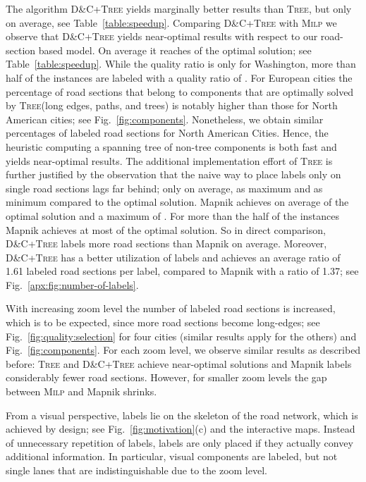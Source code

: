 \documentclass[a4paper,11pt]{article}
\newcommand{\TreeAlgo}{\textsc{Tree}\xspace}
\newcommand{\ILPAlgo}{\textsc{Milp}\xspace}
\newcommand{\Shredder}{\textsc{D\&C}}
\begin{document}
The algorithm \Shredder+\TreeAlgo yields marginally better results
than \TreeAlgo, but only  on average, see
Table~\ref{table:speedup}. Comparing \Shredder+\TreeAlgo with \ILPAlgo
we observe that \Shredder+\TreeAlgo yields near-optimal results with
respect to our road-section based model.  On average it reaches 
of the optimal solution; see Table~\ref{table:speedup}. While the
quality ratio is only  for Washington, more than half of the
instances are labeled with a quality ratio of .  For
European cities the percentage of road sections that belong to
components that are optimally solved by \TreeAlgo (long edges, paths,
and trees) is notably higher than those for North American cities; see
Fig.~\ref{fig:components}. Nonetheless, we obtain similar percentages
of labeled road sections for North American Cities. Hence, the
heuristic computing a spanning tree of non-tree components is both
fast and yields near-optimal results. The additional implementation
effort of \TreeAlgo is further justified by the observation that the
naive way to place labels only on single road sections lags far
behind; only  on average,  as maximum and  as
minimum compared to the optimal solution.  Mapnik achieves on average
 of the optimal solution and a maximum of . For more than
the half of the instances Mapnik achieves at most  of the
optimal solution. So in direct comparison, \Shredder+\TreeAlgo labels
 more road sections than Mapnik on average. 
Moreover, \Shredder+\TreeAlgo has a better utilization of labels and achieves an average ratio of 1.61 labeled road sections per label, compared to Mapnik with a ratio of 1.37; see Fig.~\ref{apx:fig:number-of-labels}.






With increasing zoom level the number of
labeled road sections is increased, which is to be expected, since
more road sections become long-edges; see
Fig.~\ref{fig:quality:selection} for four cities (similar results apply for the others) and
Fig.~\ref{fig:components}. For each zoom level, we observe
similar results as described before: \TreeAlgo and \Shredder+\TreeAlgo
achieve near-optimal solutions and
Mapnik labels considerably fewer road sections. However, for smaller zoom
levels the gap between \ILPAlgo and Mapnik shrinks. 


From a visual perspective, labels lie on the skeleton of the road
network, which is achieved by design; see Fig.~\ref{fig:motivation}(c)
and the interactive maps. Instead of unnecessary repetition of labels,
labels are only placed if they actually convey additional
information. In particular, visual components are labeled, but not
single lanes that are indistinguishable due to the zoom level.
\end{document}

